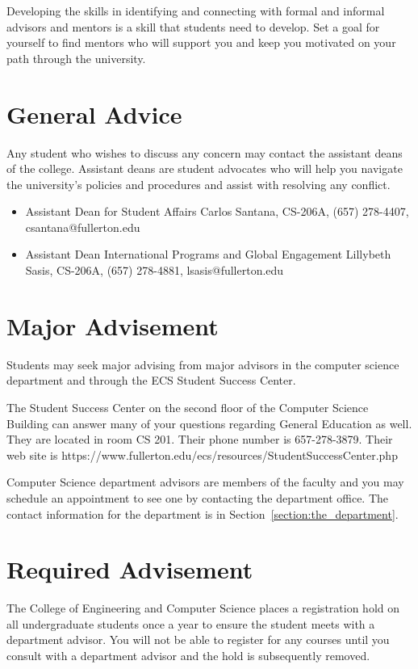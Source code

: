 \documentclass{book}
\begin{document}
Developing the skills in identifying and connecting with formal and
informal advisors and mentors is a skill that students need to
develop. Set a goal for yourself to find mentors who will support you
and keep you motivated on your path through the university.

\section{General Advice}
 Any student who wishes to discuss any
concern may contact the assistant deans of the college. Assistant
deans are student advocates who will help you navigate the
university’s policies and procedures and assist with resolving any
conflict.
\begin{itemize}
\item Assistant Dean for Student Affairs Carlos Santana, CS-206A,
  (657) 278-4407, csantana@fullerton.edu
\item Assistant Dean International Programs and Global Engagement
  Lillybeth Sasis, CS-206A, (657) 278-4881, lsasis@fullerton.edu
\end{itemize} 

\section{Major Advisement}
 Students may seek major advising from major
advisors in the computer science department and through the ECS
Student Success Center.

The Student Success Center on the second floor of the Computer Science
Building can answer many of your questions regarding General Education
as well. They are located in room CS 201. Their phone number is
657-278-3879. Their web site is
https://www.fullerton.edu/ecs/resources/StudentSuccessCenter.php

Computer Science department advisors are members of the faculty and
you may schedule an appointment to see one by contacting the
department office. The contact information for the department is in
Section~\ref{section:the_department}.

\section{Required Advisement}
 The College of Engineering and Computer
Science places a registration hold on all undergraduate students once
a year to ensure the student meets with a department advisor. You will
not be able to register for any courses until you consult with a
department advisor and the hold is subsequently removed.
\end{document}
